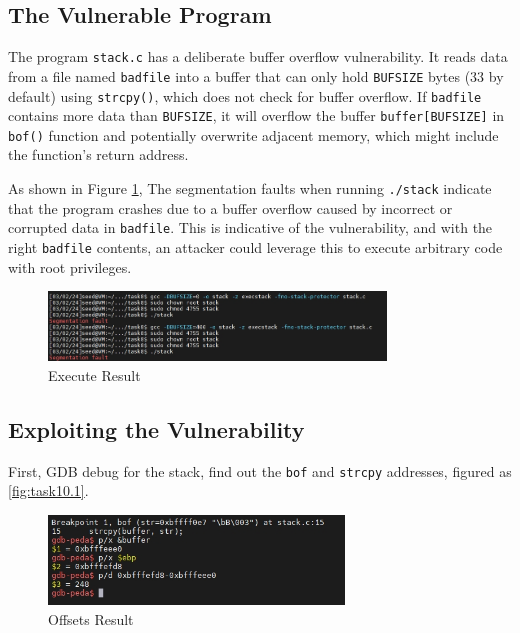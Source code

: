 \documentclass[a4paper,11pt]{article}
\begin{document}
\subsection{The Vulnerable Program}
The program \verb|stack.c| has a deliberate buffer overflow vulnerability. It reads data from a file named \verb|badfile| into a buffer that can only hold \verb|BUFSIZE| bytes (33 by default) using \verb|strcpy()|, which does not check for buffer overflow. If \verb|badfile| contains more data than \verb|BUFSIZE|, it will overflow the buffer \verb|buffer[BUFSIZE]| in \verb|bof()| function and potentially overwrite adjacent memory, which might include the function's return address.

As shown in Figure \ref{fig:task9}, The segmentation faults when running \verb|./stack| indicate that the program crashes due to a buffer overflow caused by incorrect or corrupted data in \verb|badfile|. This is indicative of the vulnerability, and with the right \verb|badfile| contents, an attacker could leverage this to execute arbitrary code with root privileges.
\begin{figure}[h]
    \centering
       \includegraphics[width=0.8\textwidth]{figures/task9/task9.png}
    \caption{Execute Result}\label{fig:task9}
\end{figure}

\subsection{Exploiting the Vulnerability}
First, GDB debug for the stack, find out the \verb|bof| and \verb|strcpy| addresses, figured as \ref{fig:task10.1}.

\begin{figure}[h]
    \centering
       \includegraphics[width=0.7\textwidth]{figures/section3/sec3-2.png}
    \caption{Offsets Result}\label{fig:task10.2}
\end{figure}
\end{document}

